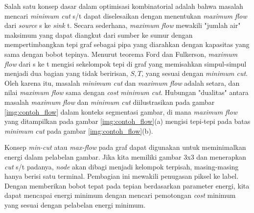 Salah satu konsep dasar dalam optimisasi kombinatorial adalah bahwa masalah mencari 
\emph{minimum cut} s/t dapat diselesaikan dengan menentukan \emph{maximum flow} dari 
\emph{source} s ke \emph{sink} t. Secara sederhana, \emph{maximum flow} mewakili 
"jumlah air" maksimum yang dapat diangkut dari sumber ke sumur dengan mempertimbangkan 
tepi graf sebagai pipa yang diarahkan dengan kapasitas yang sama dengan bobot tepinya. 
Menurut teorema Ford dan Fulkerson, \emph{maximum flow} dari s ke t mengisi sekelompok 
tepi di graf yang memisahkan simpul-simpul menjadi dua bagian yang tidak beririsan, 
\({S, T}\), yang sesuai dengan \emph{minimum cut}. Oleh karena itu, masalah 
\emph{minimum cut} dan \emph{maximum flow} adalah setara, dan nilai \emph{maximum flow} 
sama dengan \emph{cost} \emph{minimum cut}. Hubungan "dualitas" antara masalah \emph{maximum flow} 
dan \emph{minimum cut} diilustrasikan pada gambar \ref{img:contoh_flow} dalam konteks segmentasi gambar, 
di mana \emph{maximum flow} yang ditampilkan pada gambar \ref{img:contoh_flow}(a) mengisi 
tepi-tepi pada batas \emph{minimum cut} pada gambar \ref{img:contoh_flow}(b).

Konsep \emph{min-cut} atau \emph{max-flow} pada graf dapat digunakan untuk meminimalkan 
energi dalam pelabelan gambar. Jika kita memiliki gambar 3x3 dan menerapkan \emph{cut} 
s/t padanya, \emph{node} akan dibagi menjadi kelompok terpisah, masing-masing hanya 
berisi satu terminal. Pembagian ini mewakili penugasan piksel ke label. Dengan 
memberikan bobot tepat pada tepian berdasarkan parameter energi, kita dapat mencapai 
energi minimum dengan mencari pemotongan \emph{cost} minimum yang sesuai dengan 
pelabelan energi minimum.




